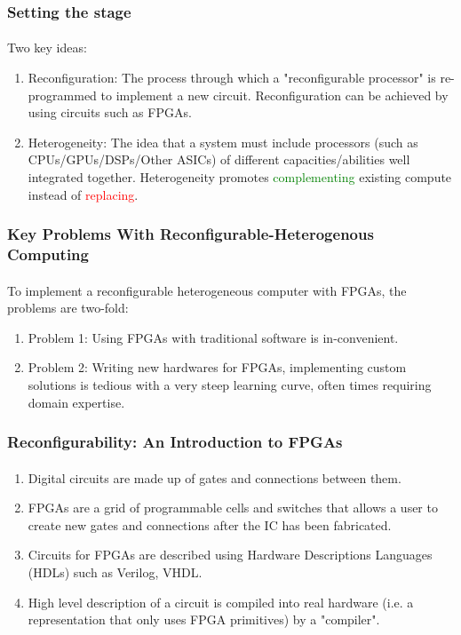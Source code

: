 \documentclass{beamer}
\begin{document}
{\begin{frame}[fragile]
  \frametitle{Setting the stage}
  \framesubtitle{}
    Two key ideas:
      \begin{enumerate}
        \item Reconfiguration: The process through which a "reconfigurable
      processor" is re-programmed to implement a new circuit. Reconfiguration
          can be achieved by using circuits such as FPGAs.
    \item Heterogeneity: The idea that a system must include processors (such as
      CPUs/GPUs/DSPs/Other ASICs) of different 
          capacities/abilities well integrated together. Heterogeneity promotes
    \textcolor{green}{complementing} existing compute instead of
          \textcolor{red}{replacing}.
      \end{enumerate}
\end{frame}

\begin{frame}[fragile]
\frametitle{Key Problems With Reconfigurable-Heterogenous Computing}
\framesubtitle{}
    To implement a reconfigurable heterogeneous computer with FPGAs,
      the problems are two-fold:
  \begin{enumerate}
    \item Problem 1: Using FPGAs with traditional software is in-convenient.
    \item Problem 2: Writing new hardwares for FPGAs, implementing custom solutions is
      tedious with a very steep learning curve, often times requiring 
      domain expertise.
  \end{enumerate}
\end{frame}

\begin{frame}[fragile]
\frametitle{Reconfigurability: An Introduction to FPGAs}
\framesubtitle{}
  \begin{enumerate}
    \item Digital circuits are made up of gates and connections between
      them.
    \item FPGAs are a grid of programmable cells and switches that allows
      a user to create new gates and connections after the IC has been
      fabricated.
    \item Circuits for FPGAs are described using Hardware Descriptions Languages
      (HDLs) such as Verilog, VHDL.
    \item High level description of a circuit is compiled into real hardware
      (i.e. a representation that only uses FPGA primitives) by a "compiler".
  \end{enumerate}


\end{frame}}
\end{document}
